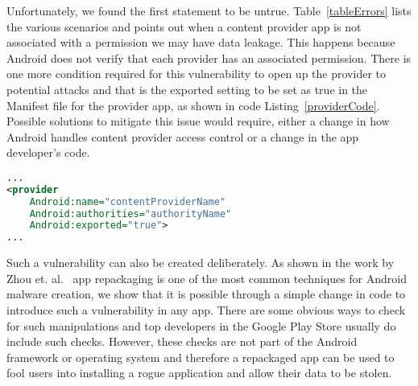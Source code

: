 \noindent
Unfortunately, we found the first statement to be untrue. Table~\ref{tableErrors} lists the various scenarios and points out when a content provider app is not associated with a permission we may have data leakage. This happens because Android does not verify that each provider has an associated permission. There is one more condition required for this vulnerability to open up the provider to potential attacks and that is the exported setting to be set as true in the Manifest file for the provider app, as shown in code Listing~\ref{providerCode}. Possible solutions to mitigate this issue would require, either a change in how Android handles content provider access control or a change in the app developer's code.

\begin{lstlisting}[caption={Provider exported tag set as true},label={providerCode},language=XML]
...
<provider
	Android:name="contentProviderName"
	Android:authorities="authorityName"
	Android:exported="true">
...
\end{lstlisting}

Such a vulnerability can also be created deliberately. As shown in the work by Zhou et. al.~\cite{Zhou2012MalwareGenomeProject} app repackaging is one of the most common techniques for Android malware creation, we show that it is possible through a simple change in code to introduce such a vulnerability in any app. There are some obvious ways to check for such manipulations and top developers in the Google Play Store usually do include such checks. However, these checks are not part of the Android framework or operating system and therefore a repackaged app can be used to fool users into installing a rogue application and allow their data to be stolen.
